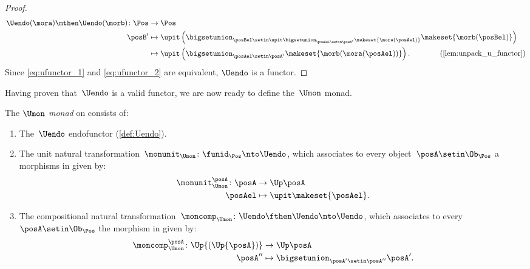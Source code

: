 \begin{proof}
\begin{equation}
\begin{aligned}
            \Uendo(\mora)\mthen \Uendo(\morb)\colon \Pos & \to \Pos \\
            \posB'                                       & \mapsto \upit \left(\bigsetunion_{\posBel\setin \upit \bigsetunion_{\posAel\setin \posB'}\makeset{\mora(\posAel)}}\makeset{\morb(\posBel)}\right) \\
                                                         & \mapsto \upit \left(\bigsetunion_{\posAel\setin \posA'} \makeset{ \morb(\mora(\posAel))}\right).
            \qquad \qquad (\cref{lem:unpack_u_functor})
        \end{aligned}
    \end{equation}
    Since \cref{eq:ufunctor_1} and \cref{eq:ufunctor_2} are equivalent, $\Uendo$ is a functor.
\end{proof}
Having proven that~$\Uendo$ is a valid functor, we are now ready to define the~$\Umon$ monad.
\begin{definition}
    \label{def:Umon}
    The \emph{$\Umon$ monad} on \Pos consists of:
    \begin{enumerate}
        \item The~$\Uendo$ endofunctor (\cref{def:Uendo}).
        \item The unit natural transformation~$\monunit_{\Umon} \colon \funid_{\Pos}\nto \Uendo$, which associates to every object~$\posA \setin \Ob_\Pos$ a morphisms in \Pos given by:
              \begin{equation}
                  \begin{aligned}
                      \monunit_{\Umon}^\posA\colon \posA & \to \Up \posA \\
                      \posAel                            & \mapsto \upit \makeset{\posAel}.
                  \end{aligned}
              \end{equation}
        \item The compositional natural transformation~$\moncomp_{\Umon}\colon \Uendo\fthen \Uendo\nto \Uendo$, which associates to every~$\posA\setin \Ob_\Pos$ the morphism in \Pos given by:
              \begin{equation}
                  \begin{aligned}
                      \moncomp_{\Umon}^\posA\colon \Up{(\Up{\posA})} & \to \Up \posA \\
                      \posA''                                        & \mapsto \bigsetunion_{\posA'\setin \posA''}\posA'.
                  \end{aligned}
              \end{equation}
    \end{enumerate}
\end{definition}

